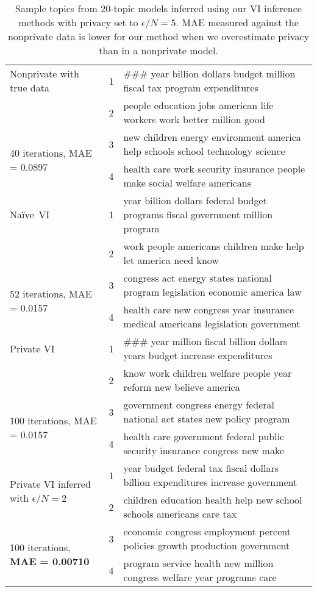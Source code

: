 \documentclass{article}
\newcommand{\Naive}{Na\"{i}ve}
\begin{document}
  \begin{table}[t]
    \center
    \small
    \begin{tabular}{|p{1.3in}|r p{4.2in}|}
      \hline
      Nonprivate with true data
      & 1  & \#\#\# year billion dollars budget million fiscal tax program expenditures \\
      & 2  & people education jobs american life workers work better million good \\
      \multirow{2}{1in}{40 iterations, MAE = 0.0897}
      & 3 & new children energy environment america help schools school technology science \\
      & 4 & health care work security insurance people make social welfare americans \\    
      \hline

      \Naive~VI
      & 1  & year billion dollars federal budget programs fiscal government million program \\
      & 2  & work people americans children make help let america need know \\
      \multirow{2}{1in}{52 iterations, MAE = 0.0157}
      & 3 & congress act energy states national program legislation economic america law \\
      & 4 & health care new congress year insurance medical americans legislation government \\     
      \hline

      Private VI
      & 1 & \#\#\# year million fiscal billion dollars years budget increase expenditures \\
      & 2 & know work children welfare people year reform new believe america \\
      \multirow{2}{1in}{100 iterations, MAE = 0.0157}
      & 3 & government congress energy federal national act states new policy program \\
      & 4 & health care government federal public security insurance congress new make \\
      \hline
      
      \multirow{2}{1in}{Private VI inferred with $\epsilon/N = 2$}
      & 1 & year budget federal tax fiscal dollars billion expenditures increase government \\
      & 2 & children education health help new school schools americans care tax \\
      \multirow{2}{1in}{100 iterations, \textbf{MAE = 0.00710}}
      & 3 & economic congress employment percent policies growth production government \\
      & 4 & program service health new million congress welfare year programs care \\
      \hline
    \end{tabular}
    \caption{Sample topics from 20-topic models inferred using our VI inference methods with privacy set to $\epsilon/N = 5$. MAE measured against the nonprivate data is lower for our method when we overestimate privacy than in a nonprivate model.}
    \label{tab:results_topics}
  \end{table}
\end{document}
